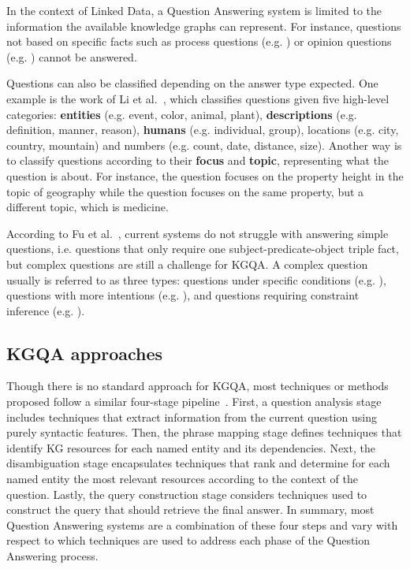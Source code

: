 In the context of Linked Data, a Question Answering system is limited to the information the 
available knowledge graphs can represent. For instance, questions not based on specific facts 
such as process questions (e.g. ) or opinion questions 
(e.g. ) cannot be answered.

Questions can also be classified depending on the answer type expected. One example is the work 
of Li et al.~\cite{qa:LiR02}, which classifies questions given five high-level categories: 
\textbf{entities} (e.g. event, color, animal, plant), \textbf{descriptions} (e.g. definition, 
manner, reason), \textbf{humans} (e.g. individual, group), locations (e.g. city, country, 
mountain) and numbers (e.g. count, date, distance, size). Another way is to classify questions 
according to their \textbf{focus} and \textbf{topic}, representing what the question is about. 
For instance, the question  focuses on the 
property height in the topic of geography while the question  focuses on the same property, but a different topic, which is medicine.

According to Fu et al.~\cite{qa:FuQTLYS20abs-2007-13069}, current systems do not struggle with 
answering simple questions, i.e. questions that only require one subject-predicate-object 
triple fact, but complex questions are still a challenge for KGQA. A complex question usually 
is referred to as three types: questions under specific conditions (e.g. ), questions with more intentions (e.g. 
), and questions requiring constraint inference (e.g. ).

\subsection{KGQA approaches}
\label{cap2:theoFrame/qakg/approaches}
Though there is no standard approach for KGQA, most techniques or methods proposed follow a 
similar four-stage pipeline~\cite{qa:core-techniques-DiefenbachLSM18}. First, a question 
analysis stage includes techniques that extract information from the current question using 
purely syntactic features. Then, the phrase mapping stage defines techniques that identify KG 
resources for each named entity and its dependencies. Next, the disambiguation stage 
encapsulates techniques that rank and determine for each named entity the most relevant 
resources according to the context of the question. Lastly, the query construction stage 
considers techniques used to construct the \SPARQL{} query that should retrieve the final answer. 
In summary, most Question Answering systems are a combination of these four steps and vary with 
respect to which techniques are used to address each phase of the Question Answering process.


